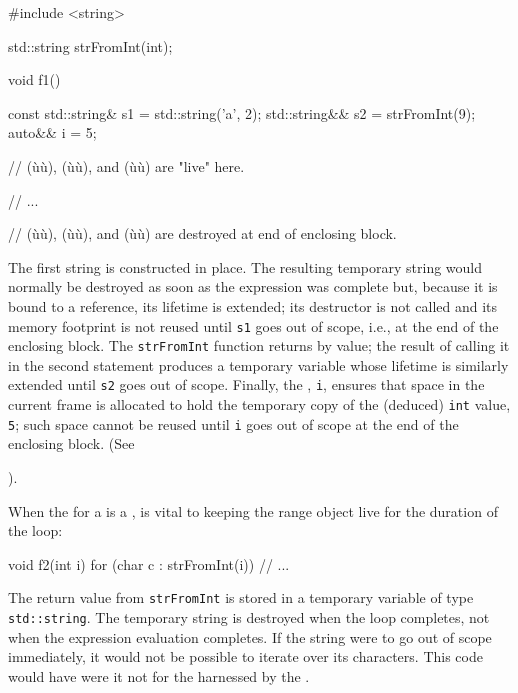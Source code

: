 {{\begin{emcppslisting}
#include <string>

std::string strFromInt(int);

void f1()
{
    const std::string& s1 = std::string('a', 2);
    std::string&&      s2 = strFromInt(9);
    auto&&             i  = 5;

    // (ù{}ù), (ù{}ù), and (ù{}ù) are "live" here.

    // ...

}  // (ù{}ù), (ù{}ù), and (ù{}ù) are destroyed at end of enclosing block.
\end{emcppslisting}
    

\noindent The first string is constructed in place. The resulting temporary string
would normally be destroyed as soon as the expression was complete but,
because it is bound to a reference, its lifetime is extended; its
destructor is not called and its memory footprint is not reused until
\lstinline!s1! goes out of scope, i.e., at the end of the enclosing block.
The \lstinline!strFromInt! function returns by value; the result of calling
it in the second statement produces a temporary variable whose lifetime
is similarly extended until \lstinline!s2! goes out of scope. Finally, the
, \lstinline!i!, ensures that space in the
current frame is allocated to hold the temporary copy of the (deduced)
\lstinline!int! value, \lstinline!5!; such space cannot be reused until
\lstinline!i! goes out of scope at the end of the enclosing block. (See
{).

When the  for a  is a ,  is
vital to keeping the range object live for the duration of the loop:

\begin{emcppslisting}
void f2(int i)
{
    for (char c : strFromInt(i))
    {
        // ...
    }
}
\end{emcppslisting}
    

\noindent The return value from \lstinline!strFromInt! is stored in a temporary
variable of type \lstinline!std::string!. The temporary string is destroyed
when the loop completes, not when the expression evaluation completes.
If the string were to go out of scope immediately, it would not be
possible to iterate over its characters. This code would have
 were it not for the  harnessed by the .

}}}
